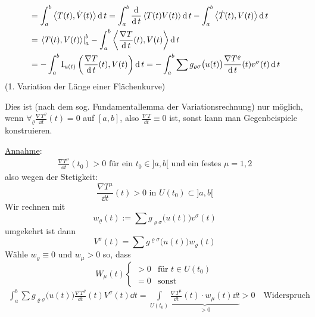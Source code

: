 \begin{beweis}
\begin{align*}
  &= \int_a^b \left\langle T(t), \dot V(t) \right\rangle \dd t = \int_a^b \frac{\dd}{\dd t} \left\langle T(t) V(t) \right\rangle \dd t - \int_a^b \left\langle \dot T(t), V(t) \right\rangle \dd t \\
  &= \left. \left\langle T(t), V(t) \right\rangle \right|_a^b - \int_a^b \left\langle \frac{\nabla T}{\dd t}(t), V(t) \right\rangle \dd t \\
  &= -\int_a^b \Rom 1_{u(t)} \left( \frac{\nabla T}{\dd t}(t) , V(t) \right) \dd t = - \int_a^b \sum g_{\varrho \sigma} \big(u(t)\big) \frac{\nabla T^\varrho}{\dd t} (t) v^\sigma(t) \dd t
 \end{align*}
 (1. Variation der Länge einer Flächenkurve) \par
 Dies ist (nach dem sog. Fundamentallemma der Variationsrechnung) nur möglich, wenn \(\forall_{\varrho} \frac{\nabla T^\varrho}{\dd t} (t) = 0\) auf \([a,b]\), also \(\frac{\nabla T}{\dd t} \equiv 0\) ist, sonst kann man Gegenbeispiele konstruieren. \par
 \uline{Annahme}: 
 \begin{align*}
  \frac{\nabla T^\mu}{\dd t}(t_0) > 0 \text{ für ein } t_0 \in ]a,b[ \text{ und ein festes } \mu = 1,2
 \end{align*}
 also wegen der Stetigkeit:
 \[
  \frac{\nabla T^\mu}{\dd t}(t) > 0 \text{ in } U(t_0) \subset ]a,b[
 \]
 Wir rechnen mit
 \[
   w_\varrho(t) := \sum g_{\varrho \sigma} \big(u(t)\big) v^\sigma(t)
 \]
 umgekehrt ist dann
 \[
  V^\sigma (t) = \sum g^{\varrho \sigma} \big(u(t)\big) w_\varrho (t)
 \]
 Wähle \(w_\varrho \equiv 0\) und \(w_\mu > 0\) so, dass 
 \[
  W_\mu(t)  \begin{cases}
             > 0 &\text{für } t \in U(t_0) \\
             = 0 &\text{sonst}
            \end{cases}
 \]
 \begin{align*}
  \int_a^b \sum g_{\varrho \sigma} \big(u(t)\big) \frac{\nabla T^\varrho}{\dd t}(t) V^\sigma(t) \dd t = \int\limits_{U(t_0)} \underbrace{\frac{\nabla T^\mu}{\dd t} (t) \cdot w_\mu(t) \dd t}_{> 0} >0 \quad \text{Widerspruch}
 \end{align*}

\end{beweis}

